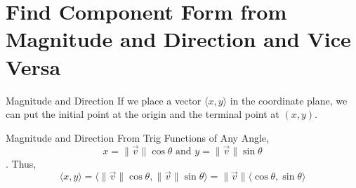 \documentclass[t,usenames,dvipsnames]{beamer}
\begin{document}
\section{Find Component Form from Magnitude and Direction and Vice Versa}

\begin{frame}{Magnitude and Direction}
If we place a vector $\langle x, y \rangle$ in the coordinate plane, we can put the initial point at the origin and the terminal point at $(x, y)$.  \newline\\
\begin{center}
\end{center}
\end{frame}

\begin{frame}{Magnitude and Direction}
    From Trig Functions of Any Angle, \[x = \lVert \vec{v} \rVert \cos \theta \text{ and } y = \lVert \vec{v} \rVert \sin \theta\]. 
\pause 
Thus, \[\langle x, y \rangle = \langle \lVert \vec{v} \lVert \cos\theta, \lVert \vec{v} \rVert \sin \theta  \rangle = \lVert \vec{v} \rVert \langle \cos \theta, \sin \theta \rangle\]
\end{frame}
\end{document}
